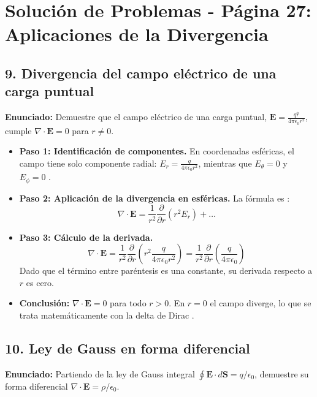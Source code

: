 \documentclass[a4paper]{article}
\begin{document}
\section*{Solución de Problemas - Página 27: Aplicaciones de la Divergencia}

\subsection*{9. Divergencia del campo eléctrico de una carga puntual}
\textbf{Enunciado:} Demuestre que el campo eléctrico de una carga puntual, $\mathbf{E} = \frac{q\hat{r}}{4\pi\epsilon_0r^2}$, cumple $\nabla \cdot \mathbf{E} = 0$ para $r \neq 0$.

\begin{itemize}
    \item \textbf{Paso 1: Identificación de componentes.} En coordenadas esféricas, el campo tiene solo componente radial: $E_r = \frac{q}{4\pi\epsilon_0r^2}$, mientras que $E_\theta = 0$ y $E_\phi = 0$ \cite{91, 92}.
    \item \textbf{Paso 2: Aplicación de la divergencia en esféricas.} La fórmula es \cite{90}:
    \begin{equation*}
        \nabla \cdot \mathbf{E} = \frac{1}{r^2} \frac{\partial}{\partial r}(r^2 E_r) + \dots
    \end{equation*}
    \item \textbf{Paso 3: Cálculo de la derivada.}
    \begin{equation*}
        \nabla \cdot \mathbf{E} = \frac{1}{r^2} \frac{\partial}{\partial r} \left( r^2 \frac{q}{4\pi\epsilon_0r^2} \right) = \frac{1}{r^2} \frac{\partial}{\partial r} \left( \frac{q}{4\pi\epsilon_0} \right)
    \end{equation*}
    Dado que el término entre paréntesis es una constante, su derivada respecto a $r$ es cero.
    \item \textbf{Conclusión:} $\nabla \cdot \mathbf{E} = 0$ para todo $r > 0$. En $r=0$ el campo diverge, lo que se trata matemáticamente con la delta de Dirac \cite{92, 171}.
\end{itemize}

\subsection*{10. Ley de Gauss en forma diferencial}
\textbf{Enunciado:} Partiendo de la ley de Gauss integral $\oint \mathbf{E} \cdot d\mathbf{S} = q/\epsilon_0$, demuestre su forma diferencial $\nabla \cdot \mathbf{E} = \rho/\epsilon_0$.
\end{document}
